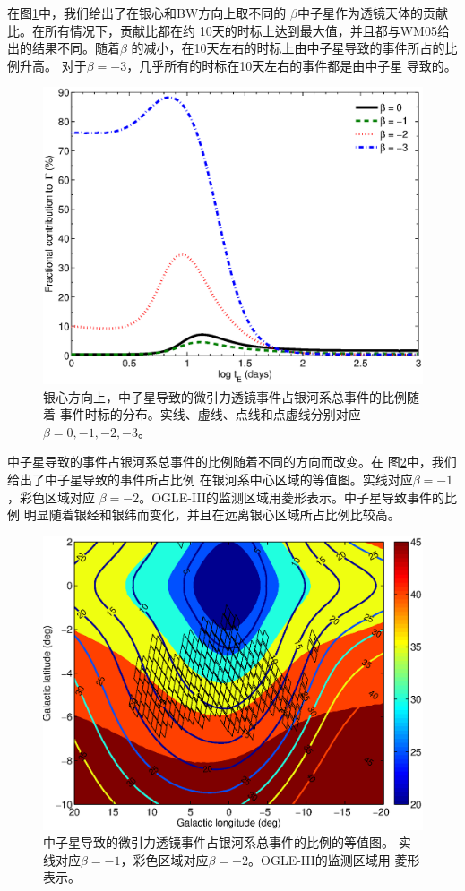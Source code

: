 在图\ref{ratio_beta}中，我们给出了在银心和BW方向上取不同的
$\beta$中子星作为透镜天体的贡献比。在所有情况下，贡献比都在约
10天的时标上达到最大值，并且都与WM05给出的结果不同。随着$\beta$
的减小，在10天左右的时标上由中子星导致的事件所占的比例升高。
对于$\beta=-3$，几乎所有的时标在10天左右的事件都是由中子星
导致的。
%
\begin{figure}
\begin{center}
  \includegraphics[width=4 in,trim=0 0 0 3cm]{ratio_beta.eps}
%
\caption{银心方向上，中子星导致的微引力透镜事件占银河系总事件的比例随着
事件时标的分布。实线、虚线、点线和点虚线分别对应$\beta=0,-1,-2,-3$。}
\label{ratio_beta}
\end{center}
\end{figure}
%

中子星导致的事件占银河系总事件的比例随着不同的方向而改变。在
图\ref{map_percentage}中，我们给出了中子星导致的事件所占比例
在银河系中心区域的等值图。实线对应$\beta=-1$，彩色区域对应
$\beta=-2$。OGLE-III的监测区域用菱形表示。中子星导致事件的比例
明显随着银经和银纬而变化，并且在远离银心区域所占比例比较高。
%
\begin{figure}
\begin{center}
  \includegraphics[width=4 in,trim=0 0 0 3cm]{map_percentage.eps}
%
\caption{中子星导致的微引力透镜事件占银河系总事件的比例的等值图。
实线对应$\beta=-1$，彩色区域对应$\beta=-2$。OGLE-III的监测区域用
菱形表示。}
\label{map_percentage}
\end{center}
\end{figure}
%

